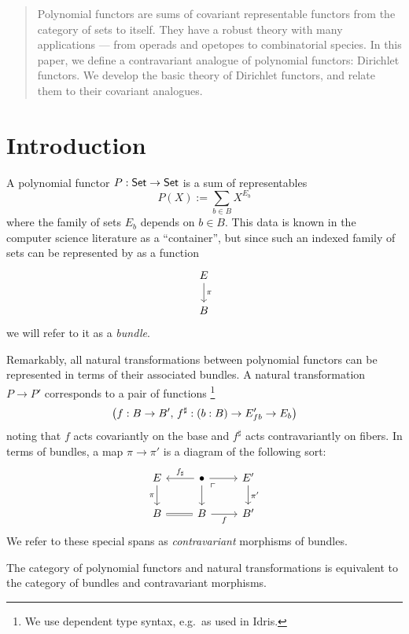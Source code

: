 
\begin{abstract}
  Polynomial functors are sums of covariant representable functors from the
  category of sets to itself. They have a robust theory with many applications
  --- from operads and opetopes to combinatorial species. In this paper, we
  define a contravariant analogue of polynomial functors: Dirichlet functors. We
  develop the basic theory of Dirichlet functors, and relate them to their
  covariant analogues.
\end{abstract}

\section{Introduction}
A polynomial functor $P : \operatorname{\mathsf{{Set}}} \to \operatorname{\mathsf{{Set}}}$ is a sum of representables
\begin{equation}\label{eqn.poly}
P(X) := \sum_{b \in B} X^{E_b}
\end{equation}
where the family of sets $E_b$ depends on $b\in B$. This data is known
in the computer science literature as a ``container'', but since such an indexed
family of sets can be represented by as a function
\[
  \begin{tikzcd}
    E \arrow[d, "\pi"] \\
    B
  \end{tikzcd}
\]
we will refer to it as a \emph{bundle}.

Remarkably, all natural transformations between polynomial functors can be
represented in terms of their associated bundles. A natural transformation $P
\to P'$ corresponds to a pair of functions%
\footnote{We use dependent type syntax, e.g.\ as used in Idris.}
\[
\left( f : B \to B',\, f^{\sharp} : ({b : B}) \to E'_{fb} \to E_b \right)
\]
noting that $f$ acts covariantly on the base and $f^\sharp$ acts contravariantly on
fibers. 
In terms of bundles, a map $\pi\to\pi'$ is a diagram of the following sort:
\[
  \begin{tikzcd}
    E \arrow[d, "\pi"'] \arrow[r, leftarrow, "f_{\sharp}"] & \bullet \arrow[d] \arrow[r]
    \arrow[dr, phantom, "\ulcorner" very near start] & E' \arrow[d, "\pi'"] \\
    B \arrow[r, equals] & B \arrow[r, "f"'] & B'
  \end{tikzcd}
\]
We refer to these special spans as \emph{contravariant} morphisms of bundles.

\begin{thm}[cite]
The category of polynomial functors and natural transformations is equivalent to
the category of bundles and contravariant morphisms.
\end{thm}

